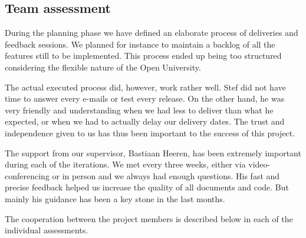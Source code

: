 
\subsection{Team assessment}
\label{assessment:team}
During the planning phase we have defined an elaborate process of deliveries and feedback sessions.
We planned for instance to maintain a backlog of all the features still to be implemented.
This process ended up being too structured considering the flexible nature of the Open University.

The actual executed process did, however, work rather well.
Stef did not have time to answer every e-mails or test every release.
On the other hand, he was very friendly and understanding when we had less to deliver than what he expected, or when we had to actually delay our delivery dates.
The trust and independence given to us has thus been important to the success of this project.

The support from our supervisor, Bastiaan Heeren, has been extremely important during each of the iterations.
We met every three weeks, either via video-conferencing or in person and we always had enough questions.
His fast and precise feedback helped us increase the quality of all documents and code.
But mainly his guidance has been a key stone in the last months.

The cooperation between the project members is described below in each of the individual assessments.
